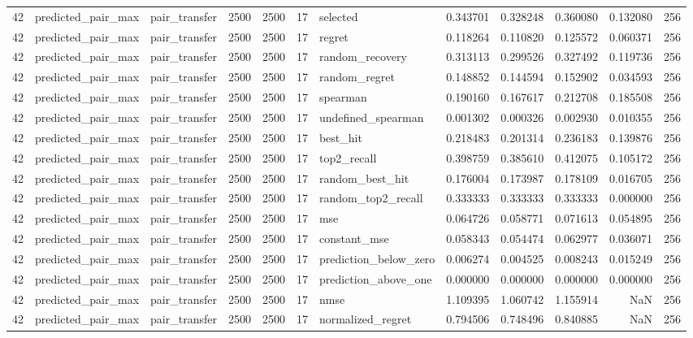 \begin{tabular}{rllrrrlrrrrr}
42 & predicted_pair_max & pair_transfer & 2500 & 2500 & 17 & selected & 0.343701 & 0.328248 & 0.360080 & 0.132080 & 256 \\
42 & predicted_pair_max & pair_transfer & 2500 & 2500 & 17 & regret & 0.118264 & 0.110820 & 0.125572 & 0.060371 & 256 \\
42 & predicted_pair_max & pair_transfer & 2500 & 2500 & 17 & random_recovery & 0.313113 & 0.299526 & 0.327492 & 0.119736 & 256 \\
42 & predicted_pair_max & pair_transfer & 2500 & 2500 & 17 & random_regret & 0.148852 & 0.144594 & 0.152902 & 0.034593 & 256 \\
42 & predicted_pair_max & pair_transfer & 2500 & 2500 & 17 & spearman & 0.190160 & 0.167617 & 0.212708 & 0.185508 & 256 \\
42 & predicted_pair_max & pair_transfer & 2500 & 2500 & 17 & undefined_spearman & 0.001302 & 0.000326 & 0.002930 & 0.010355 & 256 \\
42 & predicted_pair_max & pair_transfer & 2500 & 2500 & 17 & best_hit & 0.218483 & 0.201314 & 0.236183 & 0.139876 & 256 \\
42 & predicted_pair_max & pair_transfer & 2500 & 2500 & 17 & top2_recall & 0.398759 & 0.385610 & 0.412075 & 0.105172 & 256 \\
42 & predicted_pair_max & pair_transfer & 2500 & 2500 & 17 & random_best_hit & 0.176004 & 0.173987 & 0.178109 & 0.016705 & 256 \\
42 & predicted_pair_max & pair_transfer & 2500 & 2500 & 17 & random_top2_recall & 0.333333 & 0.333333 & 0.333333 & 0.000000 & 256 \\
42 & predicted_pair_max & pair_transfer & 2500 & 2500 & 17 & mse & 0.064726 & 0.058771 & 0.071613 & 0.054895 & 256 \\
42 & predicted_pair_max & pair_transfer & 2500 & 2500 & 17 & constant_mse & 0.058343 & 0.054474 & 0.062977 & 0.036071 & 256 \\
42 & predicted_pair_max & pair_transfer & 2500 & 2500 & 17 & prediction_below_zero & 0.006274 & 0.004525 & 0.008243 & 0.015249 & 256 \\
42 & predicted_pair_max & pair_transfer & 2500 & 2500 & 17 & prediction_above_one & 0.000000 & 0.000000 & 0.000000 & 0.000000 & 256 \\
42 & predicted_pair_max & pair_transfer & 2500 & 2500 & 17 & nmse & 1.109395 & 1.060742 & 1.155914 & NaN & 256 \\
42 & predicted_pair_max & pair_transfer & 2500 & 2500 & 17 & normalized_regret & 0.794506 & 0.748496 & 0.840885 & NaN & 256 \\

\end{tabular}

